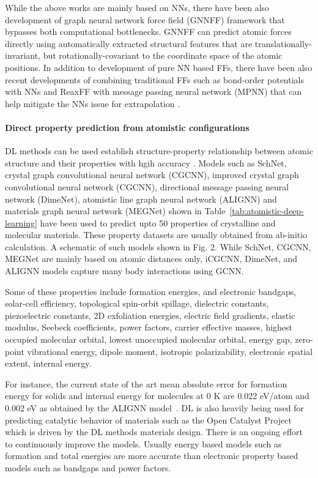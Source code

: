 \documentclass[pdflatex,sn-mathphys]{sn-jnl}%
\theoremstyle{thmstyleone}%
\theoremstyle{thmstyletwo}%
\theoremstyle{thmstylethree}%
\begin{document}
 While the above works are mainly based on NNs, there have been also development of graph neural network force field (GNNFF) framework \cite{park2021accurate,chmiela2018towards} that bypasses both computational bottlenecks. GNNFF can predict atomic forces directly using automatically extracted structural features that are translationally-invariant, but rotationally-covariant to the coordinate space of the atomic positions. In addition to development of pure NN based FFs, there have been also recent developments of combining traditional FFs such as bond-order potentials with NNs and ReaxFF with message passing neural network (MPNN) that can help mitigate the NNs issue for extrapolation \cite{pun2019physically,xue2021reaxff}.
 
 \paragraph{Direct property prediction from atomistic configurations}
 DL methods can be used establish structure-property relationship between atomic structure and their properties with hgih accuracy \cite{kearnes2016molecular,Gilmer2017}.
 Models such as SchNet, crystal graph convolutional neural network (CGCNN), improved crystal graph convolutional neural network (CGCNN), directional message passing neural network (DimeNet), atomistic line graph neural network (ALIGNN) and materials graph neural network (MEGNet) shown in Table~\ref{tab:atomistic-deep-learning} have been used to predict upto 50 properties of crystalline and molecular materials. These property datasets are usually obtained from ab-initio calculation. A schematic of such models shown in Fig. 2. While SchNet, CGCNN, MEGNet are mainly based on atomic distances only, iCGCNN, DimeNet, and ALIGNN models capture many body interactions using GCNN.
 
 Some of these properties include formation energies, and electronic bandgaps, solar-cell efficiency, topological spin-orbit spillage, dielectric constants, piezoelectric constants, 2D exfoliation energies, electric field gradients, elastic modulus, Seebeck coefficients, power factors,  carrier effective masses, highest occupied molecular orbital, lowest unoccupied molecular orbital, energy gap, zero-point vibrational energy, dipole moment, isotropic polarizability, electronic spatial extent, internal energy. 
 
 For instance, the current state of the art mean absolute error for formation energy for solids and internal energy for molecules at 0 K are 0.022 eV/atom and 0.002 eV as obtained by the ALIGNN model~\cite{choudhary2021atomistic}. DL is also heavily being used for predicting catalytic behavior of materials such as the Open Catalyst Project \cite{zitnick2020introduction} which is driven by the DL methods materials design. There is an ongoing effort to continuously improve the models. Usually energy based models such as formation and total energies are more accurate than electronic property based models such as bandgaps and power factors. 
 
\end{document}
